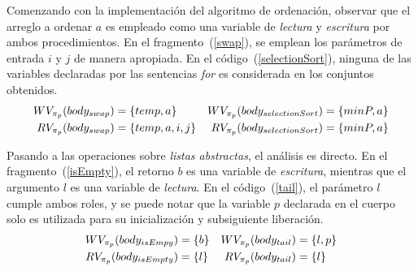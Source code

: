 Comenzando con la implementación del algoritmo de ordenación, observar que el arreglo a ordenar $a$ es empleado como una variable de \textit{lectura} y \textit{escritura} por ambos procedimientos.
En el fragmento~(\ref{swap}), se emplean los parámetros de entrada $i$ y $j$ de manera apropiada.
En el código~(\ref{selectionSort}), ninguna de las variables declaradas por las sentencias \textit{for} es considerada en los conjuntos obtenidos.
\begin{align*}
WV_{\pi_{p}}(body_{swap}) &= \{ temp, a \}
&
WV_{\pi_{p}}(body_{selectionSort}) &= \{ minP, a \}
\\
RV_{\pi_{p}}(body_{swap}) &= \{ temp, a, i, j \}
&
RV_{\pi_{p}}(body_{selectionSort}) &= \{ minP, a \}
\end{align*}

Pasando a las operaciones sobre \textit{listas abstractas}, el análisis es directo.
En el fragmento~(\ref{isEmpty}), el retorno $b$ es una variable de \textit{escritura}, mientras que el argumento $l$ es una variable de \textit{lectura}.
En el código~(\ref{tail}), el parámetro $l$ cumple ambos roles, y se puede notar que la variable $p$ declarada en el cuerpo solo es utilizada para su inicialización y subsiguiente liberación.
\begin{align*}
WV_{\pi_{p}}(body_{isEmpy}) &= \{ b \}
&
WV_{\pi_{p}}(body_{tail}) &= \{ l, p \}
\\
RV_{\pi_{p}}(body_{isEmpty}) &= \{ l \}
&
RV_{\pi_{p}}(body_{tail}) &= \{ l \}
\end{align*}






